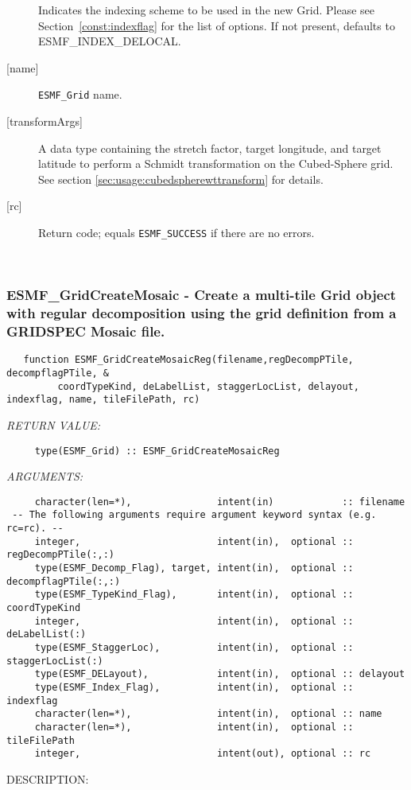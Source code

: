 \begin{description}
            Indicates the indexing scheme to be used in the new Grid. Please see
            Section~\ref{const:indexflag} for the list of options. If not present,
            defaults to ESMF\_INDEX\_DELOCAL.
       \item[{[name]}]
            {\tt ESMF\_Grid} name.
       \item[{[transformArgs]}]
            A data type containing the stretch factor, target longitude, and target latitude
            to perform a Schmidt transformation on the Cubed-Sphere grid. See section
            \ref{sec:usage:cubedspherewttransform} for details.
       \item[{[rc]}]
            Return code; equals {\tt ESMF\_SUCCESS} if there are no errors.
       \end{description}
   
 
\mbox{}\hrulefill\ 
 
\subsubsection [ESMF\_GridCreateMosaic] {ESMF\_GridCreateMosaic - Create a multi-tile Grid object with regular decomposition using the grid definition from a GRIDSPEC Mosaic file.}


 
\begin{verbatim}   function ESMF_GridCreateMosaicReg(filename,regDecompPTile, decompflagPTile, &
         coordTypeKind, deLabelList, staggerLocList, delayout, indexflag, name, tileFilePath, rc)\end{verbatim}{\em RETURN VALUE:}
\begin{verbatim}     type(ESMF_Grid) :: ESMF_GridCreateMosaicReg\end{verbatim}{\em ARGUMENTS:}
\begin{verbatim}     character(len=*),               intent(in)            :: filename
 -- The following arguments require argument keyword syntax (e.g. rc=rc). --
     integer,                        intent(in),  optional :: regDecompPTile(:,:)
     type(ESMF_Decomp_Flag), target, intent(in),  optional :: decompflagPTile(:,:)
     type(ESMF_TypeKind_Flag),       intent(in),  optional :: coordTypeKind
     integer,                        intent(in),  optional :: deLabelList(:)
     type(ESMF_StaggerLoc),          intent(in),  optional :: staggerLocList(:)
     type(ESMF_DELayout),            intent(in),  optional :: delayout
     type(ESMF_Index_Flag),          intent(in),  optional :: indexflag
     character(len=*),               intent(in),  optional :: name
     character(len=*),               intent(in),  optional :: tileFilePath
     integer,                        intent(out), optional :: rc
 \end{verbatim}
{\sf DESCRIPTION:\\ }


